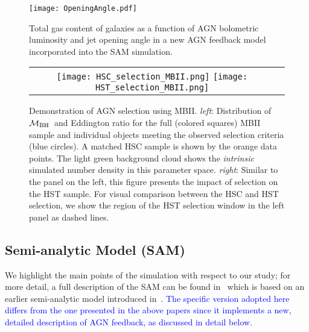 \documentclass[twocolumn]{aastex631}
\newcommand{\blue}[1]{\textcolor{blue}{#1}}
\def\mbh{$\mathcal M_{\rm BH}$}
\begin{document}
\begin{figure}
\centering
\texttt{[image: OpeningAngle.pdf]}
\caption{\label{fig:SAM} 
Total gas content of galaxies as a function of AGN bolometric luminosity and jet opening angle in a new AGN feedback model incorporated into the SAM simulation.
}
\end{figure} 

\begin{figure*}
\centering
\begin{tabular}{c c}
{\texttt{[image: HSC\_selection\_MBII.png]}}
{\texttt{[image: HST\_selection\_MBII.png]}}
\end{tabular}
\caption{\label{fig:selection}Demonstration of AGN selection using MBII. {\it left}: Distribution of \mbh\ and Eddington ratio for the full (colored squares) MBII sample and individual objects meeting the observed selection criteria (blue circles). A matched HSC sample is shown by the orange data points. The light green background cloud shows the {\it intrinsic} simulated number density in this parameter space. %
{\it right}: Similar to the panel on the left, this figure presents the impact of selection on the HST sample. For visual comparison between the HSC and HST selection, we show the region of the HST selection window in the left panel as dashed lines. 
}
\end{figure*}

\subsection{Semi-analytic Model (SAM)}\label{subsec:SAM}
We highlight the main points of the simulation with respect to our study; for more detail, a full description of the SAM can be found in~\citet{Menci2016} which is based on an earlier semi-analytic model introduced in~\citet{Menci2014}. \blue{The specific version adopted here differs from the one presented in the above papers since it implements a new, detailed description of AGN feedback, as discussed in detail below}.
\end{document}
